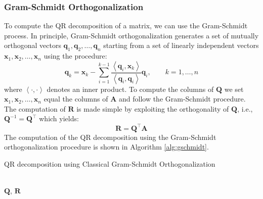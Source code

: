 \documentclass{article}[11pt]
\newcommand{\norm}[1]{\left|\left|#1\right|\right|}
\begin{document}
\subsubsection*{Gram-Schmidt Orthogonalization}
To compute the QR decomposition of a matrix, we can use the Gram-Schmidt process.
In principle, Gram-Schmidt orthogonalization generates a set of mutually orthogonal vectors $\mathbf{q}_{1},\mathbf{q}_{2},\hdots,
\mathbf{q}_{n}$ starting from a set of linearly independent vectors $\mathbf{x}_{1},\mathbf{x}_{2},\hdots,\mathbf{x}_{n}$ using the procedure:
\begin{equation}\label{eq-gschmidt}
\mathbf{q}_{k}=\mathbf{x}_{k}-\sum_{i=1}^{k-1}\frac{\left<\mathbf{q}_{i},\mathbf{x}_{k}\right>}{\left<\mathbf{q}_{i},\mathbf{q}_{i}\right>}\mathbf{q}_{i},
\qquad{k=1,\hdots,n}
\end{equation}where $\left<\cdot,\cdot\right>$ denotes an inner product. To compute the columns of $\mathbf{Q}$ we set 
$\mathbf{x}_{1},\mathbf{x}_{2},\hdots,\mathbf{x}_{n}$ equal the columns of $\mathbf{A}$ and follow the Gram-Schmidt procedure. The computation
of $\mathbf{R}$ is made simple by exploiting the orthogonality of $\mathbf{Q}$, i.e., $\mathbf{Q}^{-1}=\mathbf{Q}^{\top}$ which yields:
\begin{equation}
\mathbf{R}=\mathbf{Q}^{\top}\mathbf{A}
\end{equation}
The computation of the QR decomposition using the Gram-Schmidt orthogonalization procedure is shown in Algorithm \ref{alg:gschmidt}.
\begin{algorithm}[H]
   \begin{algorithmic}[1]
   \caption{QR decomposition using Classical Gram-Schmidt Orthogonalization}\label{alg:gschmidt}
      \EndFor
      \State{$\mathbf{Q}_{j}\gets\mathbf{v}_{j}/\norm{\mathbf{v}_{j}}_{2}$}
   \EndFor
   \\
   \Return $\mathbf{Q}$, $\mathbf{R}$
   \end{algorithmic}
\end{algorithm}
\end{document}

